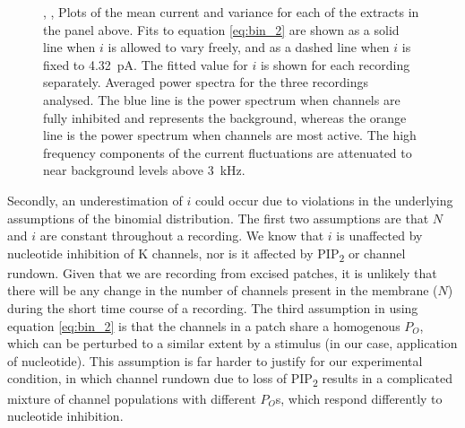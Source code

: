 \begin{figure}[hbtp]
{	, ,  Plots of the mean current and variance for each of the extracts in the panel above.
	Fits to equation \ref{eq:bin_2} are shown as a solid line when $i$ is allowed to vary freely, and as a dashed line when $i$ is fixed to \SI{4.32}{\pico\ampere}.
	The fitted value for $i$ is shown for each recording separately.
	 Averaged power spectra for the three recordings analysed.
	The blue line is the power spectrum when channels are fully inhibited and represents the background, whereas the orange line is the power spectrum when channels are most active.
	The high frequency components of the current fluctuations are attenuated to near background levels above \SI{3}{\kilo\hertz}.
	}\label{ch4fig:noise_manual}
\end{figure}

Secondly, an underestimation of $i$ could occur due to violations in the underlying assumptions of the binomial distribution.
The first two assumptions are that $N$ and $i$ are constant throughout a recording.
We know that $i$ is unaffected by nucleotide inhibition of K\ATP{} channels, nor is it affected by PIP\textsubscript{2} or channel rundown.
Given that we are recording from excised patches, it is unlikely that there will be any change in the number of channels present in the membrane ($N$) during the short time course of a recording.
The third assumption in using equation \ref{eq:bin_2} is that the channels in a patch share a homogenous $P_O$, which can be perturbed to a similar extent by a stimulus (in our case, application of nucleotide).
This assumption is far harder to justify for our experimental condition, in which channel rundown due to loss of PIP\textsubscript{2} results in a complicated mixture of channel populations with different $P_O$s, which respond differently to nucleotide inhibition.


